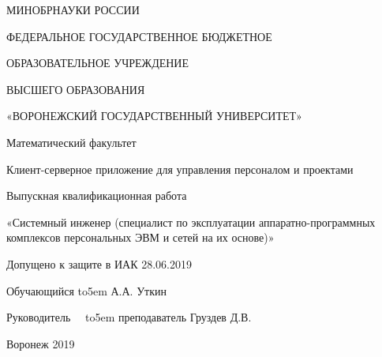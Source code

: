 \documentclass[14pt, a4paper]{extarticle}
\begin{document}
    \begin{titlepage}
        \begin{center}
            МИНОБРНАУКИ РОССИИ

            ФЕДЕРАЛЬНОЕ ГОСУДАРСТВЕННОЕ БЮДЖЕТНОЕ

            ОБРАЗОВАТЕЛЬНОЕ УЧРЕЖДЕНИЕ

            ВЫСШЕГО ОБРАЗОВАНИЯ

            «ВОРОНЕЖСКИЙ ГОСУДАРСТВЕННЫЙ УНИВЕРСИТЕТ»

            \begin{spacing}{4}
            \end{spacing}

            Математический факультет
            \begin{spacing}{5.5}
            \end{spacing}


            Клиент-серверное приложение для управления персоналом и проектами
            \begin{spacing}{4.5}
            \end{spacing}


            Выпускная квалификационная работа 

            «Системный инженер (специалист по эксплуатации аппаратно-программных комплексов персональных ЭВМ и сетей на их основе)»

        \end{center}

        \begin{spacing}{5.5}
        \end{spacing}

        Допущено к защите в ИАК	 28.06.2019

        \begin{spacing}{2}
        \end{spacing}

        \begin{spacing}{2}
        \end{spacing}
        Обучающийся \def\hrf#1{\hbox to#1{\hrulefill}}
        \hrf{5em} А.А. Уткин
        \begin{spacing}{2}
        \end{spacing}
        Руководитель\ \ \def\hrf#1{\hbox to#1{\hrulefill}}
        \hrf{5em}
                преподаватель Груздев Д.В.

        \begin{center}
            \begin{spacing}{4}
            \end{spacing}
            Воронеж 2019
        \end{center}
    \end{titlepage}
\end{document}
